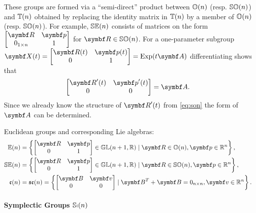 These groups are formed via a ``semi-direct'' product between ${\mathbb{O}(n)}$ (resp. ${\mathbb{SO}(n)}$) and ${\mathbb{T}(n)}$ obtained by replacing the identity matrix in ${\mathbb{T}(n)}$ by a member of ${\mathbb{O}(n)}$ (resp. ${\mathbb{SO}(n)}$). For example, ${\mathbb{SE}(n)}$ consists of matrices on the form $ \begin{bmatrix} \bR & \bp \\ 0_{1 \times n} & 1 \end{bmatrix} $ for $\bR \in \SOn$. For a one-parameter subgroup $\X(t) = \begin{bmatrix} \bR(t) & \bp(t) \\ 0 & 1 \end{bmatrix} = \Exp(t \A)$ differentiating shows that
\begin{equation}
  \begin{bmatrix} \bR'(t) & \bp'(t) \\ 0 & 0 \end{bmatrix} = \A.
\end{equation}
Since we already know the structure of $\bR'(t)$ from \eqref{eq:son} the form of $\A$ can be determined.
\begin{important}
  Euclidean groups and corresponding Lie algebras:
  \begin{subequations}
    \begin{align}
      \En  & = \left\{\begin{bmatrix} \bR & \bp \\ 0 & 1 \end{bmatrix} \in \GL(n+1, \mathbb{R}) \mid \bR \in \On, \bp \in \mathbb{R}^{n} \right\},  \\
      \SEn & = \left\{\begin{bmatrix} \bR & \bp \\ 0 & 1 \end{bmatrix} \in \GL(n+1, \mathbb{R}) \mid \bR \in \SOn, \bp \in \mathbb{R}^{n} \right\}, \\
      \en  & = \sen = \left\{\begin{bmatrix} \B & \bv \\ 0 & 0 \end{bmatrix} \mid \B^{T} + \B = 0_{n \times n}, \bv \in \mathbb{R}^{n} \right\}.
    \end{align}
  \end{subequations}
\end{important}

\paragraph{Symplectic Groups ${\mathbb{Sp}(n)}$}

